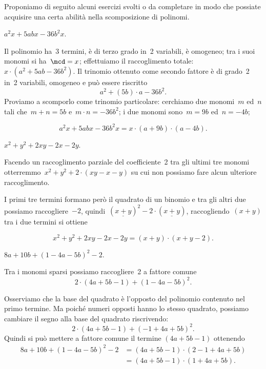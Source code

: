 Proponiamo di seguito alcuni esercizi svolti o da completare in modo che
possiate acquisire una certa abilità nella scomposizione di polinomi.
\pagebreak
\begin{exrig}
 \begin{esempio}
 $a^{2}x+5abx-36b^{2}x$.

Il polinomio ha~3 termini, è di terzo grado in~2 variabili, è
omogeneo;
tra i suoi monomi si ha~$\mcd= x$; effettuiamo il raccoglimento
totale:~$x\cdot\left(a^{2}+5ab-36b^{2}\right)$.
Il trinomio ottenuto come secondo fattore è di grado~2 in~2 variabili,
omogeneo e può essere riscritto
\[a^{2}+\left(5b\right)\cdot a-36b^{2}.\]
Proviamo a scomporlo come trinomio particolare:
cerchiamo due monomi~$m$ ed~$n$ tali che~$m+n=5b$
e~$m\cdot n=-36b^{2}$; i due monomi sono~$m=9b$
ed~$n=-4b$;

\[a^{2}x+5abx-36b^{2}x=x\cdot\left(a+9b\right)\cdot \left(a-4b\right).\]
 \end{esempio}

 \begin{esempio}
 $x^{2}+y^{2}+2xy-2x-2y$.

Facendo un raccoglimento parziale del coefficiente~2 tra gli ultimi tre
monomi otterremmo~$x^{2}+y^{2}+2\cdot(xy-x-y)$ su cui non possiamo
fare alcun ulteriore raccoglimento.

I primi tre termini formano però il quadrato di un binomio e tra gli
altri due possiamo raccogliere~$-2$, quindi~$(\underline{x+y})^{2}-2\cdot(\underline{x+y})$,
raccogliendo~$(x + y)$ tra i due termini si ottiene

\begin{equation*}
x^{2}+y^{2}+2xy-2x-2y=\left(x+y\right)\cdot \left(x+y-2\right).
\end{equation*}
 \end{esempio}

 \begin{esempio}
 $8a+10b+\left(1-4a-5b\right)^{2}-2$.

Tra i monomi sparsi possiamo raccogliere~2 a fattore comune
\[2\cdot \left(4a+5b-1\right)+\left(1-4a-5b\right)^{2}.\]

Osserviamo che la base del quadrato è l'opposto del polinomio contenuto
nel primo termine. Ma poiché numeri opposti hanno
lo stesso quadrato, possiamo cambiare il segno alla base del quadrato riscrivendo:
\[2\cdot\left(4a+5b-1\right)+\left(-1+4a+5b\right)^{2}.\]
Quindi si può mettere a fattore comune il termine $(4a+5b-1)$ ottenendo
\begin{align*}
8a+10b+(1-4a-5b)^{2}-2&=\left(4a+5b-1\right)\cdot\left(2-1+4a+5b\right)\\
&=\left(4a+5b-1\right)\cdot\left(1+4a+5b\right).
\end{align*}
 \end{esempio}


\end{exrig}
